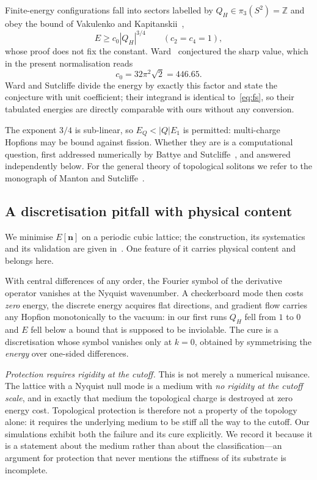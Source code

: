 \documentclass[aps,prd,preprint,nofootinbib,longbibliography]{revtex4-2}
\newcommand{\nv}{\bm{n}}
\newcommand{\Qh}{Q_H}
\begin{document}
Finite-energy configurations fall into sectors labelled by
$\Qh\in\pi_3(S^2)=\mathbb{Z}$ and obey the bound of Vakulenko and
Kapitanskii~\cite{vakulenko1979},
\begin{equation}
E\ge c_0|\Qh|^{3/4} \qquad (c_2=c_4=1),
\end{equation}
whose proof does not fix the constant. Ward~\cite{ward1999} conjectured the
sharp value, which in the present normalisation reads
\begin{equation}
c_0=32\pi^2\sqrt{2}=446.65 .
\label{eq:c0}
\end{equation}
Ward and Sutcliffe divide the energy by exactly this factor and state the
conjecture with unit coefficient; their integrand is identical
to~\eqref{eq:fs}, so their tabulated energies are directly comparable with ours
without any conversion.

The exponent $3/4$ is sub-linear, so $E_Q<|Q|E_1$ is permitted: multi-charge
Hopfions may be bound against fission. Whether they are is a computational
question, first addressed numerically by Battye and
Sutcliffe~\cite{battye1998}, and answered independently below. For the general
theory of topological solitons we refer to the monograph of Manton and
Sutcliffe~\cite{mantonsutcliffe2004}.

\subsection{A discretisation pitfall with physical content}
\label{sec:lattice}

We minimise $E[\nv]$ on a periodic cubic lattice; the construction, its
systematics and its validation are given in~\cite{lattice}. One feature of it
carries physical content and belongs here.

With central differences of any order, the Fourier symbol of the derivative
operator vanishes at the Nyquist wavenumber. A checkerboard mode then costs
\emph{zero} energy, the discrete energy acquires flat directions, and gradient
flow carries any Hopfion monotonically to the vacuum: in our first runs $\Qh$
fell from $1$ to $0$ and $E$ fell below a bound that is supposed to be
inviolable. The cure is a discretisation whose symbol vanishes only at $k=0$,
obtained by symmetrising the \emph{energy} over one-sided differences.

\emph{Protection requires rigidity at the cutoff.} This is not merely a numerical
nuisance. The lattice with a Nyquist null mode is a medium with \emph{no rigidity
at the cutoff scale}, and in exactly that medium the topological charge is
destroyed at zero energy cost. Topological protection is therefore not a property
of the topology alone: it requires the underlying medium to be stiff all the way
to the cutoff. Our simulations exhibit both the failure and its cure explicitly.
We record it because it is a statement about the medium rather than about the
classification---an argument for protection that never mentions the stiffness of
its substrate is incomplete.
\end{document}
